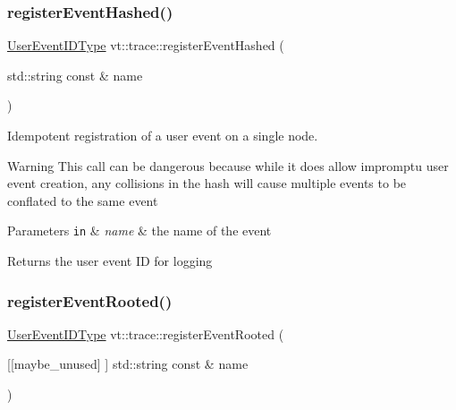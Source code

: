 \subsubsection{\texorpdfstring{register\+Event\+Hashed()}{registerEventHashed()}\hspace{0.1cm}{\footnotesize\ttfamily [2/2]}}
{\footnotesize\ttfamily \hyperlink{namespacevt_1_1trace_a5908920d051c144c89f17c69ed262350}{User\+Event\+I\+D\+Type} vt\+::trace\+::register\+Event\+Hashed (\begin{DoxyParamCaption}\item[{std\+::string const \&}]{name }\end{DoxyParamCaption})}



Idempotent registration of a user event on a single node. 

\begin{DoxyWarning}{Warning}
This call can be dangerous because while it does allow impromptu user event creation, any collisions in the hash will cause multiple events to be conflated to the same event
\end{DoxyWarning}

\begin{DoxyParams}[1]{Parameters}
\mbox{\tt in}  & {\em name} & the name of the event\\
\hline
\end{DoxyParams}
\begin{DoxyReturn}{Returns}
the user event ID for logging 
\end{DoxyReturn}
\mbox{\label{namespacevt_1_1trace_a52a73af92d5434f89ee960e8830f09ea}} 
\subsubsection{\texorpdfstring{register\+Event\+Rooted()}{registerEventRooted()}\hspace{0.1cm}{\footnotesize\ttfamily [1/2]}}
{\footnotesize\ttfamily \hyperlink{namespacevt_1_1trace_a5908920d051c144c89f17c69ed262350}{User\+Event\+I\+D\+Type} vt\+::trace\+::register\+Event\+Rooted (\begin{DoxyParamCaption}\item[{\mbox{[}\mbox{[}maybe\+\_\+unused\mbox{]} \mbox{]} std\+::string const \&}]{name }\end{DoxyParamCaption})}

